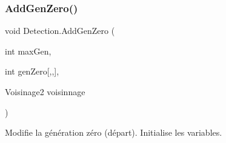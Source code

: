 \subsubsection{\texorpdfstring{Add\+Gen\+Zero()}{AddGenZero()}}
{\footnotesize\ttfamily void Detection.\+Add\+Gen\+Zero (\begin{DoxyParamCaption}\item[{int}]{max\+Gen,  }\item[{int}]{gen\+Zero\mbox{[},,\mbox{]},  }\item[{Voisinage2}]{voisinnage }\end{DoxyParamCaption})\hspace{0.3cm}{\ttfamily [inline]}}



Modifie la génération zéro (départ). Initialise les variables. 


